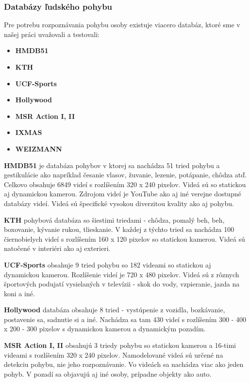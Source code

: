 \subsubsection{Databázy ľudského pohybu}
Pre potrebu rozpoznávania pohybu osoby existuje viacero databáz, ktoré sme v našej práci uvažovali a testovali:
\begin{itemize}
\item \textbf{HMDB51}
\item \textbf{KTH}
\item \textbf{UCF-Sports}
\item \textbf{Hollywood}
\item \textbf{MSR Action I, II}
\item \textbf{IXMAS}
\item \textbf{WEIZMANN}
\end{itemize}

\textbf{HMDB51} je databáza pohybov v ktorej sa nachádza 51 tried pohybu a gestikulácie ako napríklad česanie vlasov, žuvanie, lezenie, potápanie, chôdza atď. Celkovo obsahuje 6849 videí s rozlíšením 320 x 240 pixelov. Videá sú so statickou aj dynamickou kamerou. Zdrojom videí je YouTube ako aj iné verejne dostupné databázy videí. Videá sú špecifické vysokou diverzitou kvality ako aj pohybu.\cite{c1}

\textbf{KTH} pohybová databáza so šiestimi triedami - chôdza, pomalý beh, beh, boxovanie, kývanie rukou, tlieskanie. V každej z týchto tried sa nachádza 100 čiernobielych videí s rozlíšením 160 x 120 pixelov so statickou kamerou. Videá sú natočené v interiéri ako aj exterieri. \cite{c1}

\textbf{UCF-Sports} obsahuje 9 tried pohybu so 182 videami so statickou aj dynamickou kamerou. Rozlíšenie videí je 720 x 480 pixelov. Videá sú z rôznych športových podujatí vysielaných v televízii - skok do vody, vzpieranie, jazda na koni a iné.\cite{c1} 

\textbf{Hollywood} databáza obsahuje 8 tried - vystúpenie z vozidla, bozkávanie, postavenie sa, sadnutie si a iné. Nachádza sa tam 430 videí s rozlíšením 300 - 400 x 200 - 300 pixelov s dynamickou kamerou a dynamickým pozadím.\cite{c1}

\textbf{MSR Action I, II} obsahujú 3 triedy pohybu so statickou kamerou a 16-timi videami s  rozlíšením 320 x 240 pixelov. Namodelované videá sú určené na detekciu pohybu, nie jeho rozpoznávanie. Vo videách sa nachádza viac ako jeden pohyb. V pozadí sa objavujú aj iné osoby, prípadne objekty ako auto. \cite{c1}


